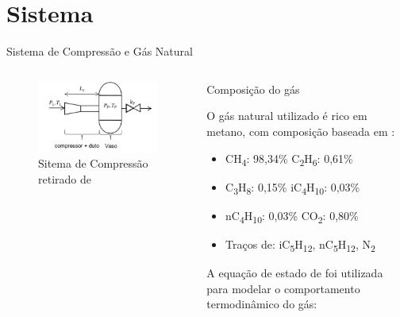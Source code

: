\section{Sistema}

\begin{frame}{Sistema de Compressão e Gás Natural}
    \begin{columns}[T] %
        \begin{column}{0.48\textwidth}
        \begin{figure}
            \centering
            \includegraphics[width=1.1\linewidth]{Figures/compressao.png}
            \caption{Sitema de Compressão retirado de \cite{Meira2022}}
            \label{fig:enter-label}
        \end{figure}
        \end{column}

        \begin{column}{0.52\textwidth}
            \scriptsize
            Composição do gás
                
            O gás natural utilizado é rico em metano, com composição baseada em \cite{Chaczykowski2009}:
            
            \vspace{0.12cm}
            \begin{itemize}  
                \item CH\textsubscript{4}: 98,34\% \quad C\textsubscript{2}H\textsubscript{6}: 0,61\%
                \item C\textsubscript{3}H\textsubscript{8}: 0,15\% \quad iC\textsubscript{4}H\textsubscript{10}: 0,03\%
                \item nC\textsubscript{4}H\textsubscript{10}: 0,03\% \quad CO\textsubscript{2}: 0,80\%
                \item Traços de: iC\textsubscript{5}H\textsubscript{12}, nC\textsubscript{5}H\textsubscript{12}, N\textsubscript{2}
            \end{itemize}
            \vspace{0.1cm}
            A equação de estado de \cite{Soave1972} foi utilizada para modelar o comportamento termodinâmico do gás:


\end{column}
\end{columns}
\end{frame}
